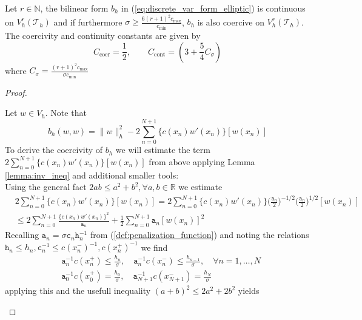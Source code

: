 \begin{theorem}
	Let $r\in \mathbb{N}$, the bilinear form $b_h$ in (\ref{eq:discrete_var_form_elliptic}) is continuous
	on $V_h^r(\mathcal{T}_h)$ and if furthermore $\sigma \geq \frac{6 (r+1)^2 c_{\max} }{c_{\min}}$, $b_h$ is also
	coercive on $V_h^r(\mathcal{T}_h)$. 
	The coercivity and continuity constants are given by 
	\begin{equation*}
		C_{\text{coer}} = \frac{1}{2}, \qquad C_{\text{cont}} = (3 + \frac{5}{4} C_{\sigma}) 
	\end{equation*}
	where $C_{\sigma} = \frac{(r+1)^2 c_{\max} }{\sigma c_{\min}}$
\end{theorem}
\begin{proof}
	\begin{proofstep}[Coercivity]
		Let $w\in V_h$. Note that
		\begin{equation}
			\label{eq:coerc_thr_relation_bilin_form_with_norm}
			b_h(w,w) = \|w\|_h^2 - 2\sum_{n=0}^{N+1}\{c(x_n)w'(x_n)\}[w(x_n)]
		\end{equation}
		To derive the coercivity of $b_h$ we will estimate the term $2\sum_{n=0}^{N+1}\{c(x_n)w'(x_n)\}[w(x_n)]$
		from above applying Lemma \ref{lemma:inv_ineq} and additional smaller tools:\\
		Using the general fact $2ab \leq a^2 + b^2, \forall a,b\in\mathbb{R}$ we estimate
		\begin{align}
			 & 2\sum_{n=0}^{N+1}\{c(x_n)w'(x_n)\}[w(x_n)] = 2\sum_{n=0}^{N+1}\{c(x_n)w'(x_n)\}
			\Big(\frac{\texttt{a}_n}{2}\Big)^{-1/2} \Big(\frac{\texttt{a}_n}{2}\Big)^{1/2} [w(x_n)]\nonumber \\
			 & \leq 2\sum_{n=0}^{N+1} \frac{\{c(x_n)w'(x_n)\}^2}{\texttt{a}_n}
			+ \frac{1}{2} \sum_{n=0}^{N+1} \texttt{a}_n [w(x_n)]^2 \label{eq:2_coerc_thr_first_estimate}
		\end{align}
		Recalling $\texttt{a}_n = \sigma \texttt{c}_n\texttt{h}_n^{-1}$ from (\ref{def:penalization_function}) and noting the relations
		$\texttt{h}_n \leq h_n, \texttt{c}_n^{-1} \leq c(x_n^-)^{-1}, c(x_n^+)^{-1}$ we find
		\begin{align*}
			 & \texttt{a}_n^{-1} c(x_n^+) \leq \frac{h_n}{\sigma}, \quad \texttt{a}_n^{-1} c(x_n^-) \leq \frac{h_{n-1}}{\sigma}, \quad \forall n=1,\ldots,N \\
			 & \texttt{a}_0^{-1} c(x_0^+) = \frac{h_0}{\sigma} , \quad \texttt{a}_{N+1}^{-1} c(x_{N+1}^-) = \frac{h_{N}}{\sigma}
		\end{align*}
		applying this and the usefull inequality $(a+b)^2 \leq 2a^2 + 2b^2$ yields

\end{proofstep}
\end{proof}
